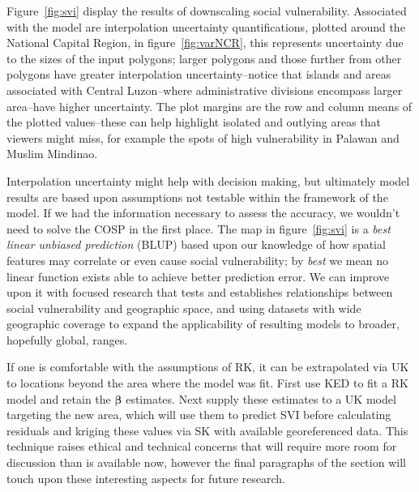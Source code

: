 \documentclass[draft]{article}
\begin{document}
Figure~\ref{fig:svi} display the results of downscaling social vulnerability.  Associated with the model are interpolation uncertainty quantifications, plotted around the National Capital Region, in figure~\ref{fig:varNCR}, this represents uncertainty due to the sizes of the input polygons; larger polygons and those further from other polygons have greater interpolation uncertainty--notice that islands and areas associated with Central Luzon--where administrative divisions encompass larger area--have higher uncertainty.  The plot margins are the row and column means of the plotted values--these can help highlight isolated and outlying areas that viewers might miss, for example the spots of high vulnerability in Palawan and Muslim Mindinao.

Interpolation uncertainty might help with decision making, but ultimately model results are based upon assumptions not testable within the framework of the model.  If we had the information necessary to assess the accuracy, we wouldn't need to solve the COSP in the first place.  The map in figure~\ref{fig:svi} is a {\em best linear unbiased prediction} (BLUP) based upon our knowledge of how spatial features may correlate or even cause social vulnerability; by {\em best} we mean no linear function exists able to achieve better prediction error.  We can improve upon it with focused research that tests and establishes relationships between social vulnerability and geographic space, and using datasets with wide geographic coverage to expand the applicability of resulting models to broader, hopefully global, ranges.

If one is comfortable with the assumptions of RK, it can be extrapolated via UK to locations beyond the area where the model was fit.  First use KED to fit a RK model and retain the $\bm{\beta}$ estimates.  Next supply these estimates to a UK model targeting the new area, which will use them to predict SVI before calculating residuals and kriging these values via SK with available georeferenced data.  This technique raises ethical and technical concerns that will require more room for discussion than is available now, however the final paragraphs of the section will touch upon these interesting aspects for future research.
\end{document}
